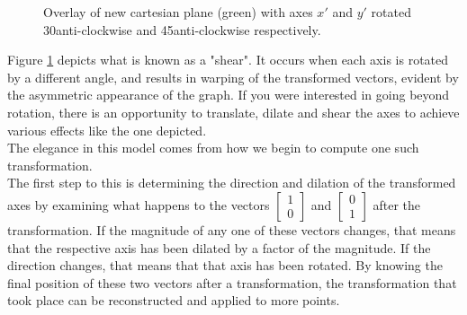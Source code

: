 \documentclass[12pt, a4paper]{article}
\begin{document}
\begin{figure}[H]
    \caption{ Overlay of new cartesian plane (green) with axes $x'$ and $y'$
        rotated 30\textdegree\space anti-clockwise and 45\textdegree\space anti-clockwise respectively. }
    \label{2d_axis_shear}
\end{figure}

Figure \ref{2d_axis_shear} depicts what is known as a "shear". It occurs when
each axis is rotated by a different angle, and results in warping of the
transformed vectors, evident by the asymmetric appearance of the graph. If you
were interested in going beyond rotation, there is an opportunity to translate,
dilate and shear the axes to achieve various effects like the one depicted.\\

The elegance in this model comes from how we begin to compute one such
transformation. \\

The first step to this is determining the direction and dilation of the
transformed axes by examining what happens to the vectors $\begin{bmatrix} 1 \\
        0\end{bmatrix}$ and $\begin{bmatrix} 0 \\
        1\end{bmatrix}$ after the transformation. If the magnitude of any one of these
vectors changes, that means that the respective axis has been dilated by a
factor of the magnitude. If the direction changes, that means that that axis has
been rotated. By knowing the final position of these two vectors after a
transformation, the transformation that took place can be reconstructed and
applied to more points. \\
\end{document}
